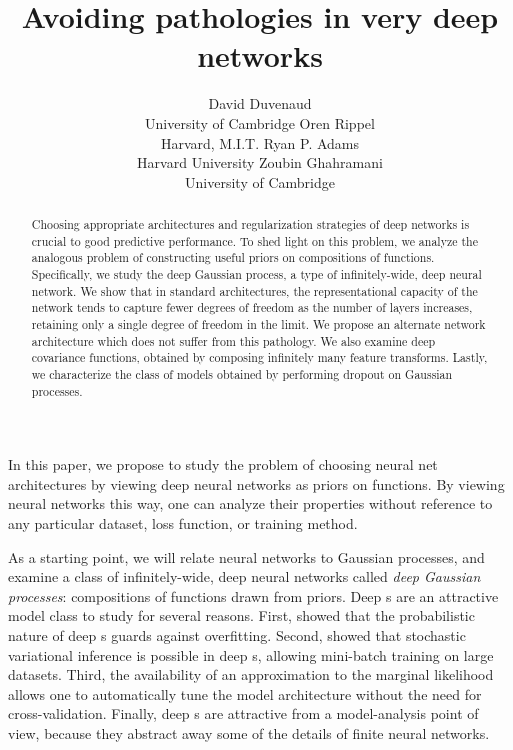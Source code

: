 \documentclass{article} %
\title{Avoiding pathologies in very deep networks}
\author{
David Duvenaud\\
University of Cambridge
\And
Oren Rippel \\
Harvard, M.I.T.
\And
Ryan P. Adams\\
Harvard University
\And
Zoubin Ghahramani \\
University of Cambridge
}
\begin{document}
\maketitle

\begin{abstract}
Choosing appropriate architectures and regularization strategies of deep networks is crucial to good predictive performance.
To shed light on this problem, we analyze the analogous problem of constructing useful priors on compositions of functions.
Specifically, we study the deep Gaussian process, a type of infinitely-wide, deep neural network.
We show that in standard architectures, the representational capacity of the network tends to capture fewer degrees of freedom as the number of layers increases, retaining only a single degree of freedom in the limit.
We propose an alternate network architecture which does not suffer from this pathology.
We also examine deep covariance functions, obtained by composing infinitely many feature transforms.
Lastly, we characterize the class of models obtained by performing dropout on Gaussian processes.
\end{abstract}

In this paper, we propose to study the problem of choosing neural net architectures by viewing deep neural networks as priors on functions.
By viewing neural networks this way, one can analyze their properties without reference to any particular dataset, loss function, or training method.

As a starting point, we will relate neural networks to Gaussian processes, and examine a class of infinitely-wide, deep neural networks called \emph{deep Gaussian processes}: compositions of functions drawn from \gp{} priors.
Deep \gp{}s are an attractive model class to study for several reasons.
First, \citet{damianou2012deep} showed that the probabilistic nature of deep \gp{}s guards against overfitting.
Second, \citet{hensman2014deep} showed that stochastic variational inference is possible in deep \gp{}s, allowing mini-batch training on large datasets.
Third, the availability of an approximation to the marginal likelihood allows one to automatically tune the model architecture without the need for cross-validation.
Finally, deep \gp{}s are attractive from a model-analysis point of view, because they abstract away some of the details of finite neural networks. %
\end{document}
